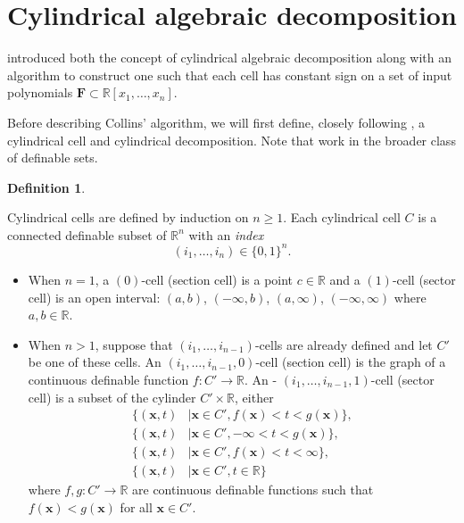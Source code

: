 \documentclass[
]{book}
\theoremstyle{definition}
\newtheorem{definition}{Definition}[chapter]
\theoremstyle{definition}
\theoremstyle{definition}
\theoremstyle{definition}
\theoremstyle{remark}
\begin{document}
\hypertarget{cylindrical-algebraic-decomposition}{%
\section{Cylindrical algebraic decomposition}\label{cylindrical-algebraic-decomposition}}

\citet{collins1975} introduced both the concept of cylindrical algebraic decomposition along with an algorithm to construct one such that each cell has constant sign on a set of input polynomials \(\mathbf{F} \subset \mathbb{R}[x_1,\ldots,x_n]\).

Before describing Collins' algorithm, we will first define, closely following \citet{bgv15}, a cylindrical cell and cylindrical decomposition. Note that \citet{bgv15} work in the broader class of definable sets.

\begin{definition}
\protect\hypertarget{def:cells}{}\label{def:cells}

Cylindrical cells are defined by induction on \(n\ge 1\). Each cylindrical cell \(C\) is a connected definable subset of \(\mathbb{R}^n\) with an \emph{index}
\[
(i_1,\ldots,i_n) \in \{0,1\}^n.
\]

\begin{itemize}
\item
  When \(n = 1\), a \((0)\)-cell (section cell) is a point \(c \in \mathbb{R}\) and a \((1)\)-cell (sector cell) is an open interval: \((a,b)\), \((-\infty,b)\), \((a,\infty)\), \((-\infty,\infty)\) where \(a,b\in \mathbb{R}\).
\item
  When \(n > 1\), suppose that \((i_1,\ldots,i_{n-1})\)-cells are already defined and let \(C'\) be one of these cells.
  An \((i_1,\ldots,i_{n-1},0)\)-cell (section cell) is the graph of a continuous definable function \(f : C' \to \mathbb{R}\).
  An - \((i_1,\ldots,i_{n-1},1)\)-cell (sector cell) is a subset of the cylinder \(C' \times \mathbb{R}\), either
  \[
  \begin{aligned}
  \{ (\mathbf{x},t) &\mid \mathbf{x} \in C', f(\mathbf{x}) < t < g(\mathbf{x})\},\\
  \{ (\mathbf{x},t) &\mid \mathbf{x} \in C', -\infty < t < g(\mathbf{x})\},\\
  \{ (\mathbf{x},t) &\mid \mathbf{x} \in C', f(\mathbf{x}) < t < \infty\},\\
  \{ (\mathbf{x},t) &\mid \mathbf{x} \in C', t \in \mathbb{R}\}
  \end{aligned}
  \]
  where \(f,g : C' \to \mathbb{R}\) are continuous definable functions such that \(f(\mathbf{x}) < g(\mathbf{x})\) for all \(\mathbf{x} \in C'\).
\end{itemize}

\end{definition}
\end{document}
